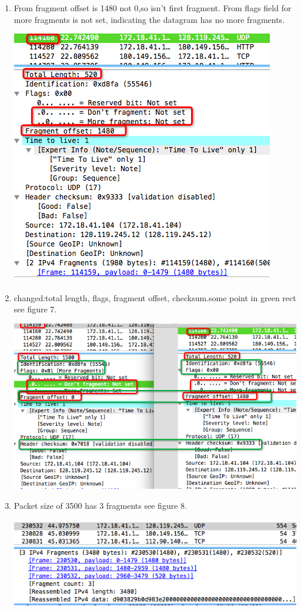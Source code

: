 \documentclass[a4paper]{article}
\begin{document}
{\begin{enumerate}
	\item From fragment offset is 1480 not 0,so isn't first fragment.
	      From flags field for more fragments is not set, indicating the datagram has no more fragments.
	\begin{center} \includegraphics[scale=0.5]{Illustrations/6.png} \end{center}
	\item changed:total length, flags, fragment offset, checksum.some point in green rect see figure 7. 
	\begin{center} \includegraphics[scale=0.5]{Illustrations/7.png} \end{center}
	\item Packet size of 3500 has 3 fragments see figure 8. 
	\begin{center} \includegraphics[scale=0.5]{Illustrations/8.png} \end{center}

\end{enumerate}}
\end{document}
